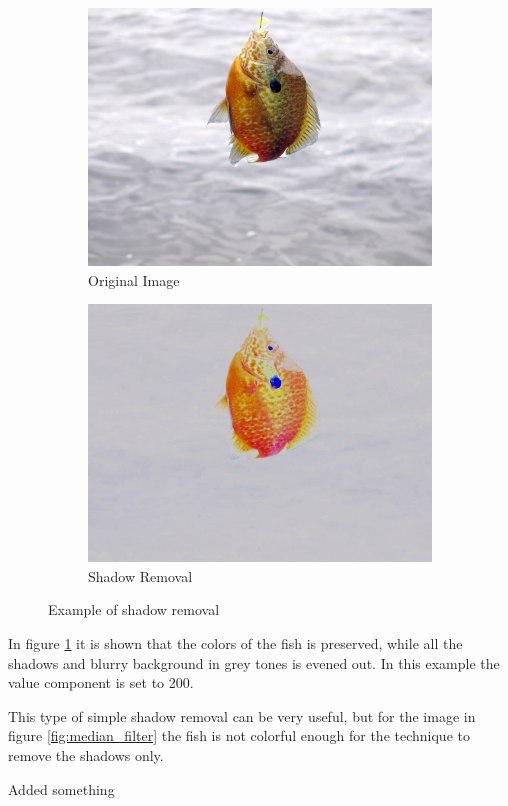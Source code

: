 \begin{figure}[h]
    \centering
    \begin{subfigure}{0.5\textwidth}
        \centering
        \includegraphics[width=.9\linewidth]{Images/colorfish}
        \caption{Original Image}
    \end{subfigure}%
    \begin{subfigure}{.5\textwidth}
        \centering
        \includegraphics[width=.9\linewidth]{Images/shadow_removal}
        \caption{Shadow Removal}
    \end{subfigure}
    \caption{Example of shadow removal}
    \label{fig:shadow_removal}
\end{figure}

In figure \ref{fig:shadow_removal} it is shown that the colors of the fish is preserved, while all the shadows and blurry background in grey tones is evened out. In this example the value component is set to 200.

This type of simple shadow removal can be very useful, but for the image in figure \ref{fig:median_filter} the fish is not colorful enough for the technique to remove the shadows only.

Added something

